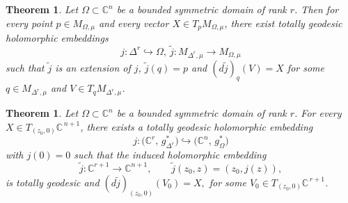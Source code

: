 \documentclass[reqno, 11pt]{amsart}
\newtheorem{theorem}[theor]{Theorem}
\begin{document}
\begin{theorem}\label{THMhpoly}
Let \(\Omega\subset\mathbb{C}^n\) be a bounded symmetric domain of rank \(r\).
Then for every point \(p\in M_{\Omega,\mu}\) and every vector \(X\in T_{p}M_{\Omega,\mu}\),
there exist  totally geodesic holomorphic  embeddings
\[j \colon \Delta^{r}\hookrightarrow\Omega, \  \widetilde{j}\colon M_{\Delta^{r},\mu}\longrightarrow M_{\Omega,\mu}\] 
such that  $\widetilde{j}$ is an extension of $j$, 
\(\widetilde{j}(q)=p\) and
\((d\widetilde{j})_{q}(V)=X\) for some \(q\in M_{\Delta^{r},\mu}\) and \(V\in T_qM_{\Delta^{r},\mu}\).
\end{theorem}



\begin{theorem}\label{THMhpolydual}
Let $\Omega \subset \mathbb{C}^n$ be a bounded symmetric domain of rank $r$.
For every $X \in T_{(z_0, 0)}\mathbb{C}^{\,n+1}$, there exists a  totally geodesic holomorphic embedding
\[
j: \bigl(\mathbb{C}^r,\, g_{\Delta^r}^*\bigr)\hookrightarrow \bigl(\mathbb{C}^n,\, g_{\Omega}^*\bigr)
\]
with $j(0)=0$ such that  the induced holomorphic embedding
\[
\widetilde{j}\colon \mathbb{C}^{r+1}\longrightarrow \mathbb{C}^{n+1},\qquad
\widetilde{j}(z_0,z)=(z_0, j(z)),
\]
is totally geodesic and
$
(d\widetilde{j})_{(z_0,0)}(V_0)=X,
$
for some $V_0\in T_{(z_0,0)}\mathbb{C}^{\,r+1}$. 
\end{theorem}
\end{document}
